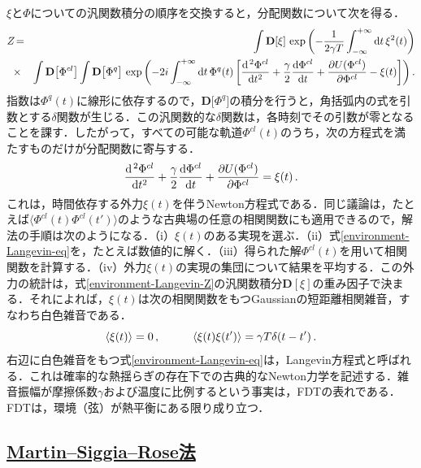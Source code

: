 \documentclass[a4paper,11pt]{ltjsarticle}
\newcommand{\subsectionlink}[1]{\subsection[#1]{\hyperlink{toc}{#1}}}
\def\d{\mathrm{d}}
\def\D{\mathbf{D}}
\begin{document}
$\xi$と$\Phi$についての汎関数積分の順序を交換すると，分配関数について次を得る．
\begingroup{}
\begin{eqnarray}\label{environment-Langevin-Z}
 Z\!&=&\!\int\D[\xi]\,
 \exp\left(-{1\over 2\gamma T}\int^{+\infty}_{-\infty}\d t\, \xi^2(t)\right)\nonumber\\
 &\times&\! \int\D\big[\Phi^{cl}\big]\int\D\big[\Phi^{q}\big]\,
 \exp\left(-2i\int^{+\infty}_{-\infty}\d t\, \Phi^{q}(t)
 \left[ {\d^{\,2}\Phi^{cl}\over \d t^2} +{\gamma\over 2}{\d
\Phi^{cl}\over \d t}+ {\partial U(\Phi^{cl})\over
\partial \Phi^{cl} }-\xi(t) \right]\right).
\end{eqnarray}
\endgroup{}指数は$\Phi^{q}(t)$に線形に依存するので，$\D\big[\Phi^{q}\big]$の積分を行うと，角括弧内の式を引数とする$\delta$関数が生じる．この汎関数的な$\delta$関数は，各時刻でその引数が零となることを課す．したがって，すべての可能な軌道$\Phi^{cl}(t)$のうち，次の方程式を満たすものだけが分配関数に寄与する．
\begin{equation}\label{environment-Langevin-eq}
 {\d^{\,2} \Phi^{cl}\over \d t^2} +{\gamma\over 2}{\d \Phi^{cl}\over
\d t} + {\partial U(\Phi^{cl})\over \partial \Phi^{cl} } = \xi(t) \,.
\end{equation}これは，時間依存する外力$\xi(t)$を伴うNewton方程式である．同じ議論は，たとえば$\big\langle
\Phi^{cl}(t)\Phi^{cl}(t')\big\rangle$のような古典場の任意の相関関数にも適用できるので，解法の手順は次のようになる．（i）$\xi(t)$のある実現を選ぶ．（ii）式\eqref{environment-Langevin-eq}を，たとえば数値的に解く．（iii）得られた解$\Phi^{cl}(t)$を用いて相関関数を計算する．（iv）外力$\xi(t)$の実現の集団について結果を平均する．この外力の統計は，式\eqref{environment-Langevin-Z}の汎関数積分$\D[\xi]$の重み因子で決まる．それによれば，$\xi(t)$は次の相関関数をもつGaussianの短距離相関雑音，すなわち白色雑音である．
\begin{equation}\label{environment-Langevin-noise}
\langle \xi(t) \rangle = 0\,, \hskip 1cm \langle \xi(t)
\xi(t')\rangle = \gamma T \delta(t-t')\,.
\end{equation}右辺に白色雑音をもつ式\eqref{environment-Langevin-eq}は，Langevin方程式と呼ばれる．これは確率的な熱揺らぎの存在下での古典的なNewton力学を記述する．雑音振幅が摩擦係数$\gamma$および温度に比例するという事実は，FDTの表れである．FDTは，環境（弦）が熱平衡にある限り成り立つ．


\subsectionlink{Martin--Siggia--Rose法}\label{sec_environment-4}
\end{document}
